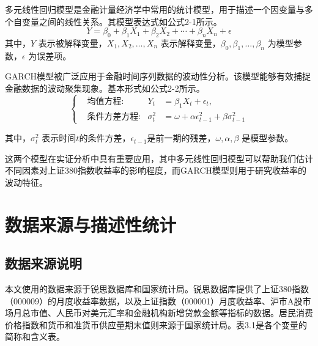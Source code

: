 \documentclass[12pt, a4paper]{article}
\numberwithin{equation}{section}
\begin{document}
多元线性回归模型是金融计量经济学中常用的统计模型，用于描述一个因变量与多个自变量之间的线性关系。其模型表达式如公式2-1所示。
\begin{equation}
    Y = \beta_0 + \beta_1X_1 + \beta_2X_2 + \cdots + \beta_nX_n + \epsilon \tag{2-1}
\end{equation}
其中，$Y$ 表示被解释变量，$X_1, X_2, \ldots, X_n$ 表示解释变量，$\beta_0, \beta_1, \ldots, \beta_n$ 为模型参数，$\epsilon$ 为误差项。

GARCH模型被广泛应用于金融时间序列数据的波动性分析。该模型能够有效捕捉金融数据的波动聚集现象。基本形式如公式2-2所示。
\begin{equation}
    \left\{
    \begin{aligned}
         & \text{均值方程:}   & Y_t        & = \beta_1X_t + \epsilon_t,                                \\
         & \text{条件方差方程:} & \sigma_t^2 & = \omega + \alpha \epsilon_{t-1}^2 + \beta \sigma_{t-1}^2
    \end{aligned}
    \right. \tag{2-2}
\end{equation}

其中，$\sigma_t^2$ 表示时间$t$的条件方差，$\epsilon_{t-1}$是前一期的残差，$\omega, \alpha, \beta$ 是模型参数。

这两个模型在实证分析中具有重要应用，其中多元线性回归模型可以帮助我们估计不同因素对上证380指数收益率的影响程度，而GARCH模型则用于研究收益率的波动特征。

\newpage
\section{数据来源与描述性统计}

\subsection{数据来源说明}
本文使用的数据来源于锐思数据库和国家统计局。锐思数据库提供了上证380指数（000009）的月度收益率数据，以及上证指数（000001）月度收益率、沪市A股市场月总市值、人民币对美元汇率和金融机构新增贷款金额等指标的数据。居民消费价格指数和货币和准货币供应量期末值则来源于国家统计局。表3.1是各个变量的简称和含义表。
\end{document}
